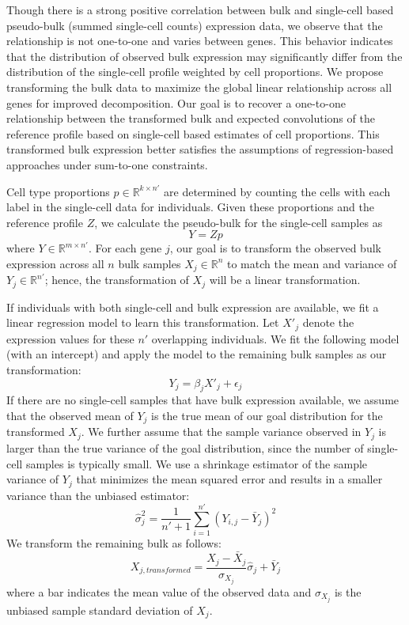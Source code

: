 Though there is a strong positive correlation between bulk and single-cell based pseudo-bulk (summed single-cell counts) expression data, we observe that the relationship is not one-to-one and varies between genes. This behavior indicates that the distribution of observed bulk expression may significantly differ from the distribution of the single-cell profile weighted by cell proportions. We propose transforming the bulk data to maximize the global linear relationship across all genes for improved decomposition. Our goal is to recover a one-to-one relationship between the transformed bulk and expected convolutions of the reference profile based on single-cell based estimates of cell proportions. This transformed bulk expression better satisfies the assumptions of regression-based approaches under sum-to-one constraints. 

Cell type proportions $p \in \mathbb{R}^{k \times n'}$ are determined by counting the cells with each label in the single-cell data for  individuals. Given these proportions and the reference profile $Z$, we calculate the pseudo-bulk for the single-cell samples as 
\begin{equation}
    Y=Zp
\end{equation}
where $Y \in \mathbb{R}^{m \times n'}$. For each gene $j$, our goal is to transform the observed bulk expression across all $n$ bulk samples $X_j \in \mathbb{R}^n$ to match the mean and variance of $Y_j \in \mathbb{R}^{n'}$; hence, the transformation of $X_j$ will be a linear transformation. 

If individuals with both single-cell and bulk expression are available, we fit a linear regression model to learn this transformation. Let $X'_j$ denote the expression values for these $n'$ overlapping individuals. We fit the following model (with an intercept) and apply the model to the remaining bulk samples as our transformation:
\begin{equation}
	Y_j = \beta_jX'_j + \epsilon_j
\end{equation}
If there are no single-cell samples that have bulk expression available, we assume that the observed mean of $Y_j$ is the true mean of our goal distribution for the transformed $X_j$. We further assume that the sample variance observed in $Y_j$ is larger than the true variance of the goal distribution, since the number of single-cell samples is typically small. We use a shrinkage estimator of the sample variance of $Y_j$ that minimizes the mean squared error and results in a smaller variance than the unbiased estimator:
\begin{equation}
	\hat{\sigma}^2_j = \frac{1}{n' + 1} \sum_{i=1}^{n'}(Y_{i,j} - \bar{Y}_j)^2
\end{equation}
We transform the remaining bulk as follows:
\begin{equation}
	X_{j,transformed} = \frac{X_j - \bar{X}_j}{\sigma_{X_j}} \hat{\sigma}_j + \bar{Y}_j
\end{equation}
where a bar indicates the mean value of the observed data and $\sigma_{X_j}$ is the unbiased sample standard deviation of  $X_j$.


